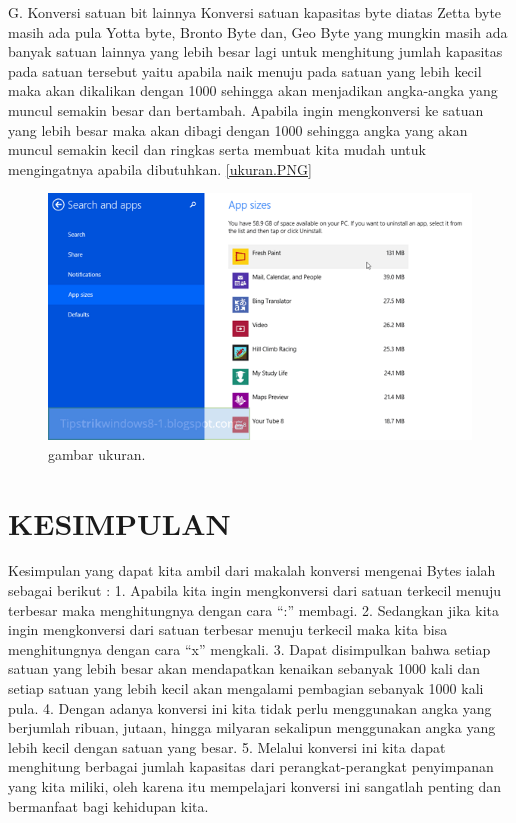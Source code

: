 G. Konversi satuan bit lainnya
Konversi satuan kapasitas byte diatas Zetta byte masih ada pula Yotta byte, Bronto Byte dan, Geo Byte yang mungkin masih ada banyak satuan lainnya yang lebih besar lagi untuk menghitung jumlah kapasitas pada satuan tersebut yaitu apabila naik menuju pada satuan yang lebih kecil maka akan dikalikan dengan 1000 sehingga akan menjadikan angka-angka yang muncul semakin besar dan bertambah. 
Apabila ingin mengkonversi ke satuan yang lebih besar maka akan dibagi dengan 1000 sehingga angka yang akan muncul semakin kecil dan ringkas serta membuat kita mudah untuk mengingatnya apabila dibutuhkan.
\ref{ukuran.PNG}
\begin{figure}[ht]
\centerline{\includegraphics[width=1\textwidth]{figures/ukuran.PNG}}
\caption{gambar ukuran.}
\label{ukuran.png}
\end{figure}

\section {KESIMPULAN}
Kesimpulan yang dapat kita ambil dari makalah konversi mengenai Bytes ialah sebagai berikut :
1.	Apabila kita ingin mengkonversi dari satuan terkecil menuju terbesar maka menghitungnya dengan cara “:” membagi.
2.	Sedangkan jika kita ingin mengkonversi dari satuan terbesar menuju terkecil maka kita bisa menghitungnya dengan cara “x” mengkali.
3.	Dapat disimpulkan bahwa setiap satuan yang lebih besar akan mendapatkan kenaikan sebanyak 1000 kali dan setiap satuan yang lebih kecil akan mengalami pembagian sebanyak 1000 kali pula.
4.	Dengan adanya konversi ini kita tidak perlu menggunakan angka yang berjumlah ribuan, jutaan, hingga milyaran sekalipun menggunakan angka yang lebih kecil dengan satuan yang besar.
5.	Melalui konversi ini kita dapat menghitung berbagai jumlah kapasitas dari perangkat-perangkat penyimpanan yang kita miliki, oleh karena itu mempelajari konversi ini sangatlah penting dan bermanfaat bagi kehidupan kita. \cite{jungwirth2002information}